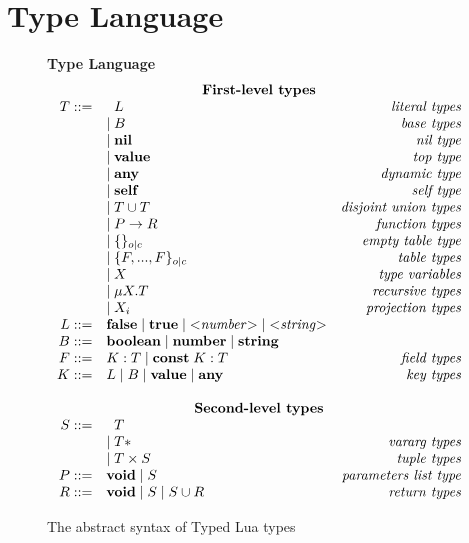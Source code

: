 
\section{Type Language}

\begin{figure}[!ht]
\textbf{Type Language}\\
\dstart
$$
\begin{array}{rlr}
\multicolumn{3}{c}{\textbf{First-level types}}\\
T ::= & \;\; L & \textit{literal types}\\
& | \; B & \textit{base types}\\
& | \; \Nil & \textit{nil type}\\
& | \; \Value & \textit{top type}\\
& | \; \Any & \textit{dynamic type}\\
& | \; \Self & \textit{self type}\\
& | \; T \cup T & \textit{disjoint union types}\\
& | \; P \rightarrow R & \textit{function types}\\
& | \; \{ \}_{o|c} & \textit{empty table type}\\
& | \; \{F, ..., F\}_{o|c} & \textit{table types}\\
& | \; X & \textit{type variables}\\
& | \; \mu X.T & \textit{recursive types}\\
& | \; X_{i} & \textit{projection types}\\
L ::= & \False \; | \; \True \; | \; {<}{\it number}{>} \; | \; {<}{\it string}{>} & \\
B ::= & \Boolean \; | \; \Number \; | \; \String & \\
F ::= & K:T \; | \; \Const \; K:T & \textit{field types}\\ 
K ::= & L \; | \; B \; | \; \Value \; | \; \Any & \textit{key types}\\
\multicolumn{3}{c}{}\\
\multicolumn{3}{c}{\textbf{Second-level types}}\\
S ::= & \;\; T &\\
& | \; T* & \textit{vararg types}\\
& | \; T \times S & \textit{tuple types}\\
P ::= & \Void \; | \; S & \textit{parameters list type}\\
R ::= & \Void \; | \; S \; | \; S \cup R & \textit{return types}\\
\end{array}
$$
\dend
\caption{The abstract syntax of Typed Lua types}
\label{fig:typelang}
\end{figure}

